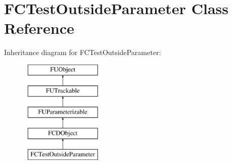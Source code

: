 \hypertarget{classFCTestOutsideParameter}{
\section{FCTestOutsideParameter Class Reference}
\label{classFCTestOutsideParameter}
}
Inheritance diagram for FCTestOutsideParameter:\begin{figure}[H]
\begin{center}
\leavevmode
\includegraphics[height=5.000000cm]{classFCTestOutsideParameter}
\end{center}
\end{figure}
